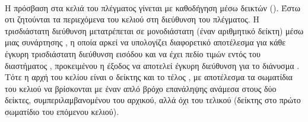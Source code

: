 \paragraph{} Η πρόσβαση στα κελιά του πλέγματος γίνεται με καθοδήγηση μέσω δεικτών
(). Έστω οτι ζητούνται τα περιεχόμενα του κελιού στη διεύθυνση
 του πλέγματος. Η τρισδιάστατη διεύθυνση μετατρέπεται σε μονοδιάστατη (έναν
αριθμητικό δείκτη) μέσω μιας συνάρτησης , η οποία αρκεί να υπολογίζει
διαφορετικό αποτέλεσμα για κάθε έγκυρη τρισδιάστατη διεύθυνση εισόδου και να έχει πεδίο
τιμών εντός του διαστήματος , προκειμένου η έξοδος να αποτελεί
έγκυρη διεύθυνση για το διάνυσμα . Τότε η αρχή του κελίου είναι ο δείκτης
 και το τέλος , με αποτέλεσμα τα
σωματίδια του κελιού να βρίσκονται με έναν απλό βρόχο επανάληψης ανάμεσα στους δύο
δείκτες, συμπεριλαμβανομένου του αρχικού, αλλά όχι του τελικού (δείκτης στο πρώτο
σωματίδιο του επόμενου κελιού).

